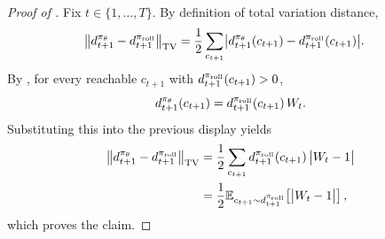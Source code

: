 \begin{proof}[Proof of ]
Fix $t\in\{1,\ldots,T\}$. By definition of total variation distance,
\begin{align*}
    \bigl\|d_{t+1}^{\pi_{\theta}} - d_{t+1}^{\pi_{\mathrm{roll}}}\bigr\|_{\mathrm{TV}}
    &=
    \frac{1}{2}\sum_{c_{t+1}} \bigl|d_{t+1}^{\pi_{\theta}}(c_{t+1}) - d_{t+1}^{\pi_{\mathrm{roll}}}(c_{t+1})\bigr|.
\end{align*}
By , for every reachable $c_{t+1}$ with $d_{t+1}^{\pi_{\mathrm{roll}}}(c_{t+1})>0$,
\begin{equation*}
    d_{t+1}^{\pi_{\theta}}(c_{t+1})
    =
    d_{t+1}^{\pi_{\mathrm{roll}}}(c_{t+1})\,W_t.
\end{equation*}
Substituting this into the previous display yields
\begin{align*}
    \bigl\|d_{t+1}^{\pi_{\theta}} - d_{t+1}^{\pi_{\mathrm{roll}}}\bigr\|_{\mathrm{TV}}
    &=
    \frac{1}{2}\sum_{c_{t+1}} d_{t+1}^{\pi_{\mathrm{roll}}}(c_{t+1})\,\bigl|W_t - 1\bigr|
    \\
    &=
    \frac{1}{2}\mathbb{E}_{c_{t+1}\sim d_{t+1}^{\pi_{\mathrm{roll}}}}\!\left[\bigl|W_t - 1\bigr|\right],
\end{align*}
which proves the claim.
\end{proof}

